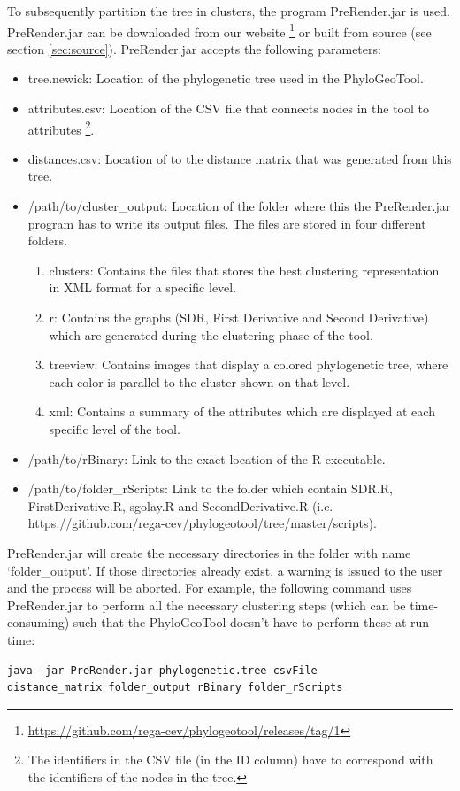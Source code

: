 \documentclass[a4paper, 11pt]{article} %
\begin{document}
To subsequently partition the tree in clusters, the program PreRender.jar is used. PreRender.jar can be downloaded from our website \footnote{\url{https://github.com/rega-cev/phylogeotool/releases/tag/1}} or built from source (see section \ref{sec:source}). 
PreRender.jar accepts the following parameters:
\begin{itemize}
\item tree.newick: Location of the phylogenetic tree used in the PhyloGeoTool.
\item attributes.csv: Location of the CSV file that connects nodes in the tool to attributes \footnote{The identifiers in the CSV file (in the ID column) have to correspond with the identifiers of the nodes in the tree.}.
\item distances.csv: Location of to the distance matrix that was generated from this tree.
\item /path/to/cluster\_output: Location of the folder where this the PreRender.jar program has to write its output files. The files are stored in four different folders.
\begin{enumerate}
	\item clusters: Contains the files that stores the best clustering representation in XML format for a specific level.
	\item r: Contains the graphs (SDR, First Derivative and Second Derivative) which are generated during the clustering phase of the tool.
	\item treeview: Contains images that display a colored phylogenetic tree, where each color is parallel to the cluster shown on that level.
	\item xml: Contains a summary of the attributes which are displayed at each specific level of the tool.
\end{enumerate}
\item /path/to/rBinary: Link to the exact location of the R executable.
\item /path/to/folder\_rScripts: Link to the folder which contain SDR.R, FirstDerivative.R, sgolay.R and SecondDerivative.R (i.e. https://github.com/rega-cev/phylogeotool/tree/master/scripts).
\end{itemize}
PreRender.jar will create the necessary directories in the folder with name `folder\_output'.
If those directories already exist, a warning is issued to the user and the process will be aborted.
For example, the following command uses PreRender.jar to perform all the necessary clustering steps (which can be time-consuming) such that the PhyloGeoTool doesn't have to perform these at run time: 
\begin{verbatim}
java -jar PreRender.jar phylogenetic.tree csvFile
distance_matrix folder_output rBinary folder_rScripts
\end{verbatim}
\end{document}
